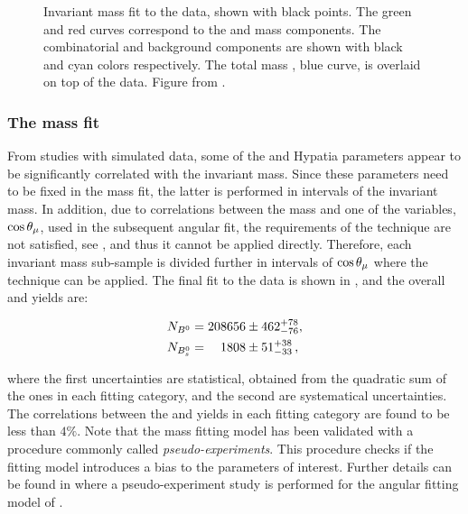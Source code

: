 \begin{figure}[t]
  \centering
  \scalebox{0.5}{}
  \caption{Invariant mass fit to the data, shown with black points. The green and red curves correspond to the \BdJpsiKpi and
           \BsJpsiKpi mass \pdf components. The combinatorial and \LbJpsippi background components are shown with black and cyan
           colors respectively. The total mass \pdf, blue curve, is overlaid on top of the data. Figure from \cite{bsjpsikst-paper}. }
  \label{mass_plot}
\end{figure}

\subsubsection{The mass fit}
From studies with simulated data, some of the \Bs and \Bd Hypatia parameters appear to be significantly correlated with the \mkpi
invariant mass. Since these parameters need to be fixed in the mass fit, the latter is performed in intervals of the
\mkpi invariant mass. In addition, due to correlations between the mass and one of the variables, $\cos\theta_{\mu}$, used in
the subsequent angular fit, the requirements of the \sPlot technique are not satisfied, see ,
and thus it cannot be applied directly. Therefore, each \mkpi invariant mass sub-sample is divided further in intervals of
$\cos\theta_{\mu}$ where the \sPlot technique can be applied. The final fit to the data is shown in , and the
overall \BsJpsiKst and \BdJpsiKst yields are:

\begin{align}
  \centering
  N_{\Bd} &= 208656  \pm  462 ^{+ 78}_{-76}, \\
  N_{\Bs} &= \phantom{00}1808  \pm  51 ^{+ 38}_{-33} \, ,
  \label{signal_yields}
\end{align}

\noindent where the first uncertainties are statistical, obtained from the quadratic sum of the ones in each fitting category,
and the second are systematical uncertainties. The correlations between the \Bd and \Bs yields in each fitting category
are found to be less than $4\%$. Note that the mass fitting model has been validated with a procedure commonly called {\it pseudo-experiments}.
This procedure checks if the fitting model introduces a bias to the parameters of interest. Further details can be found in
 where a pseudo-experiment study is performed for the angular fitting model of .

